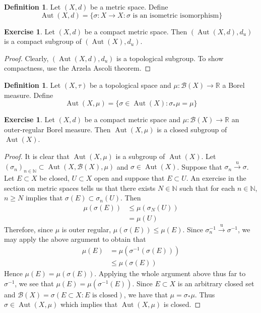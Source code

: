 \documentclass[12pt]{amsart}
\theoremstyle{definition}
\newtheorem{defn}[definition]{Definition}
\newtheorem{ex}[definition]{Exercise}
\newcommand{\sig}{\sigma}
\newcommand{\N}{\mathbb{N}}
\newcommand{\R}{\mathbb{R}}
\newcommand{\MB}{\mathcal{B}}
\newcommand{\convt}[1]{\xrightarrow{\text{#1}}}
\DeclareMathOperator{\Aut}{Aut}
\DeclareMathOperator*{\0}{\mbf{0}}
\DeclareMathOperator*{\1}{\mbf{1}}
\newcommand{\lex}[1]{\label{ex:#1}}
\newcommand{\ld}[1]{\label{defn:#1}}
\begin{document}
	\begin{defn} \ld{}
	Let $(X, d)$ be a metric space. Define 
	$$\Aut(X, d) = \{\sig:X\rightarrow X: \sig \text{ is an isometric isomorphism} \}$$  
	\end{defn}
	
	\begin{ex} \lex{}
	Let $(X, d)$ be a compact metric space. Then $(\Aut(X, d), d_u)$ is a compact subgroup of $(\Aut(X), d_u)$.
	\end{ex}
	
	\begin{proof}
	Clearly, $(\Aut(X, d), d_u)$ is a topological subgroup. To show compactness, use the Arzela Ascoli theorem.
	\end{proof}
	
	\begin{defn} \ld{}
	Let $(X, \tau)$ be a topological space and $\mu: \MB(X) \rightarrow \R$ a Borel measure. Define $$\Aut(X, \mu) = \{\sig \in \Aut(X): \sig_* \mu = \mu\}$$ 
	\end{defn}	
	
	\begin{ex} \lex{}
	Let $(X,d)$ be a compact metric space and $\mu: \MB(X) \rightarrow \R$ an outer-regular Borel measure. Then $\Aut(X, \mu)$ is a closed subgroup of $\Aut(X)$.
	\end{ex}
	
	\begin{proof}
	It is clear that $\Aut(X, \mu)$ is a subgroup of $\Aut(X)$. Let $(\sig_n)_{n \in \N} \subset \Aut(X, \MB(X), \mu)$ and $\sig \in \Aut(X)$. Suppose that $\sig_n \convt{u} \sig$. Let $E \subset X$ be closed, $U \subset X$ open and suppose that $E \subset U$. An exercise in the section on metric spaces tells us that there exists $N \in \N$ such that for each $n \in \N$, $n \geq N$ implies that $\sig(E) \subset \sig_n(U)$. Then 
	\begin{align*}
	\mu(\sig(E)) 
	&\leq \mu(\sig_N(U)) \\
	&= \mu(U) 
	\end{align*}
	Therefore, since $\mu$ is outer regular, $\mu(\sig(E)) \leq \mu(E)$. Since $\sig_n^{-1} \convt{u} \sig^{-1}$, we may apply the above argument to obtain that 
	\begin{align*}
	\mu(E) 
	&= \mu(\sig^{-1}(\sig (E))) \\
	&\leq  \mu(\sig(E))
\end{align*}	 
Hence $\mu(E) = \mu(\sig(E))$. Applying the whole argument above thus far to $\sig^{-1}$, we see that $\mu(E) = \mu(\sig^{-1}(E))$. Since $E \subset X$ is an arbitrary closed set and $\MB(X) = \sig(E \subset X: E \text{ is closed})$, we have that $\mu = \sig_*\mu$. Thus $\sig \in \Aut(X, \mu)$ which implies that $\Aut(X, \mu)$ is closed. 
	\end{proof}
	
\end{document}

